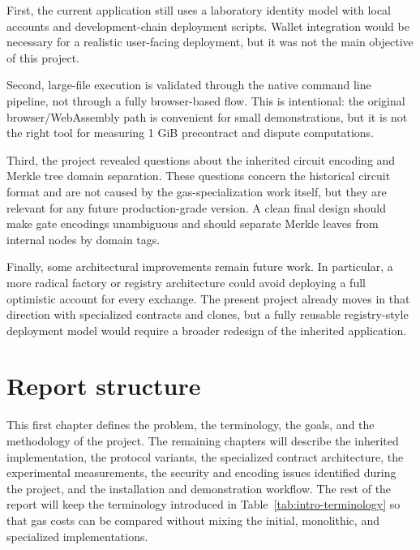 First, the current application still uses a laboratory identity model with local accounts and
development-chain deployment scripts. Wallet integration would be necessary for a realistic
user-facing deployment, but it was not the main objective of this project.

Second, large-file execution is validated through the native command line pipeline, not
through a fully browser-based flow. This is intentional: the original browser/WebAssembly
path is convenient for small demonstrations, but it is not the right tool for measuring 1 GiB
precontract and dispute computations.

Third, the project revealed questions about the inherited circuit encoding and Merkle tree
domain separation. These questions concern the historical circuit format and are not caused
by the gas-specialization work itself, but they are relevant for any future production-grade
version. A clean final design should make gate encodings unambiguous and should separate
Merkle leaves from internal nodes by domain tags.

Finally, some architectural improvements remain future work. In particular, a more radical
factory or registry architecture could avoid deploying a full optimistic account for every
exchange. The present project already moves in that direction with specialized contracts and
clones, but a fully reusable registry-style deployment model would require a broader redesign
of the inherited application.

\section{Report structure}

This first chapter defines the problem, the terminology, the goals, and the methodology of
the project. The remaining chapters will describe the inherited implementation, the protocol
variants, the specialized contract architecture, the experimental measurements, the security
and encoding issues identified during the project, and the installation and demonstration
workflow. The rest of the report will keep the terminology introduced in
Table~\ref{tab:intro-terminology} so that gas costs can be compared without mixing the
initial, monolithic, and specialized implementations.
